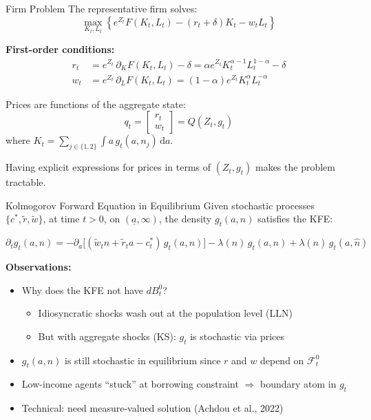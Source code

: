 \documentclass[aspectratio=169,11pt]{beamer}
\newcommand{\emphc}[1]{\textcolor{harvardcrimson}{#1}}
\newcommand{\ud}{\,\mathrm{d}}
\newcommand{\ubar}[1]{\underline{#1}}
\begin{document}
\begin{frame}{Firm Problem}
\small
The representative firm solves:
\[
\max_{K_t, L_t} \left\{e^{Z_t}F(K_t, L_t) - (r_t + \delta)K_t - w_t L_t\right\}
\]

\textbf{First-order conditions:}
\begin{align*}
r_t &= e^{Z_t}\,\partial_K F(K_t, L_t) - \delta = \alpha e^{Z_t} K_t^{\alpha-1}L_t^{1-\alpha} - \delta \\[6pt]
w_t &= e^{Z_t}\,\partial_L F(K_t, L_t) = (1-\alpha)e^{Z_t}K_t^\alpha L_t^{-\alpha}
\end{align*}

\vspace{0.2em}
Prices are \emphc{functions of the aggregate state}:
\[
q_t = \begin{bmatrix} r_t \\ w_t \end{bmatrix} = Q(Z_t, g_t)
\]
where $K_t = \sum_{j \in \{1,2\}} \int a\,g_t(a, n_j)\ud a$.

\vspace{0.3em}
{\small Having explicit expressions for prices in terms of $(Z_t, g_t)$ makes the problem tractable.}
\end{frame}

\begin{frame}{Kolmogorov Forward Equation in Equilibrium}
\small
Given stochastic processes $\{c^*, \tilde{r}, \tilde{w}\}$, at time $t > 0$, on $(\ubar{a}, \infty)$, the \emphc{density} $g_t(a,n)$ satisfies the KFE:

\[
\boxed{\partial_t g_t(a,n) = -\partial_a\!\Big[(\tilde{w}_t n + \tilde{r}_t a - c_t^*)\,g_t(a,n)\Big] - \lambda(n)\,g_t(a,n) + \lambda(\hat{n})\,g_t(a,\hat{n})}
\]

\vspace{0.2em}
\textbf{Observations:}
\begin{itemize}\itemsep2pt
    \item Why does the KFE \emphc{not} have $dB_t^0$?
    \begin{itemize}
        \item Idiosyncratic shocks wash out at the population level (LLN)
        \item But with aggregate shocks (KS): $g_t$ is stochastic via prices
    \end{itemize}
    \item $g_t(a,n)$ is still stochastic in equilibrium since $r$ and $w$ depend on $\mathcal{F}_t^0$
    \item Low-income agents ``stuck'' at borrowing constraint $\Rightarrow$ boundary atom in $g_t$
    \item Technical: need \emphc{measure-valued} solution (Achdou et al., 2022)
\end{itemize}
\end{frame}
\end{document}
